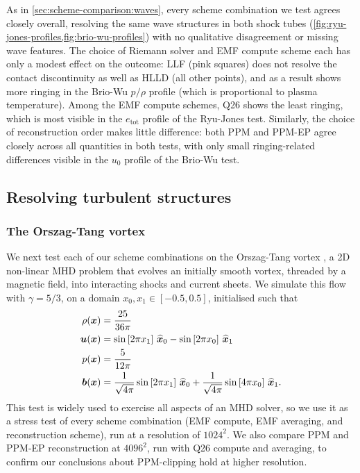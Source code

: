As in \cref{sec:scheme-comparison:waves}, every scheme combination we test agrees closely overall, resolving the same wave structures in both shock tubes (\cref{fig:ryu-jones-profiles,fig:brio-wu-profiles}) with no qualitative disagreement or missing wave features. The choice of Riemann solver and EMF compute scheme each has only a modest effect on the outcome: LLF (pink squares) does not resolve the contact discontinuity as well as HLLD (all other points), and as a result shows more ringing in the Brio-Wu $p/\rho$ profile (which is proportional to plasma temperature). Among the EMF compute schemes, Q26 shows the least ringing, which is most visible in the $e_\mathrm{tot}$ profile of the Ryu-Jones test. Similarly, the choice of reconstruction order makes little difference: both PPM and PPM-EP agree closely across all quantities in both tests, with only small ringing-related differences visible in the $u_0$ profile of the Brio-Wu test.

\subsection{Resolving turbulent structures}
\label{sec:scheme-comparison:orszag-tang}

\subsubsection{The Orszag-Tang vortex}
\label{sec:scheme-comparison:orszag-tang:setup}

We next test each of our scheme combinations on the Orszag-Tang vortex \citep{OrszagTang1979}, a 2D non-linear MHD problem that evolves an initially smooth vortex, threaded by a magnetic field, into interacting shocks and current sheets. We simulate this flow with $\gamma = 5/3$, on a domain $x_0, x_1 \in [-0.5, 0.5]$, initialised such that
\begin{align}
    \rho(\bm{x})
        &= \frac{25}{36\pi} \\
    \bm{u}(\bm{x})
        &= \sin\left[ 2\pi x_1 \right]\, \widehat{\bm{x}}_0
        - \sin\left[ 2\pi x_0 \right]\, \widehat{\bm{x}}_1 \\
    p(\bm{x})
        &= \frac{5}{12\pi} \\
    \bm{b}(\bm{x})
        &= \frac{1}{\sqrt{4\pi}} \sin\left[ 2\pi x_1 \right]\, \widehat{\bm{x}}_0
        + \frac{1}{\sqrt{4\pi}} \sin\left[ 4\pi x_0 \right]\, \widehat{\bm{x}}_1
    .
\end{align}
This test is widely used to exercise all aspects of an MHD solver, so we use it as a stress test of every scheme combination (EMF compute, EMF averaging, and reconstruction scheme), run at a resolution of $1024^2$. We also compare PPM and PPM-EP reconstruction at $4096^2$, run with Q26 compute and  averaging, to confirm our conclusions about PPM-clipping hold at higher resolution.

